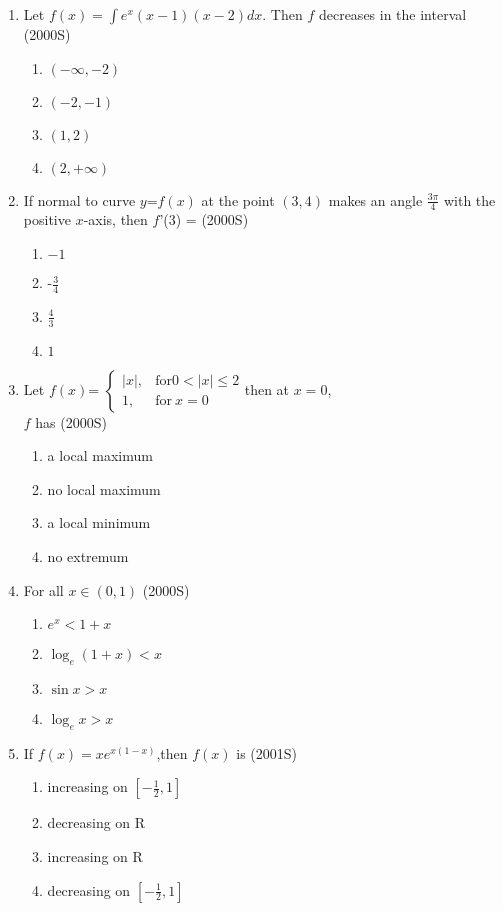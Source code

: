 \documentclass[journal,12pt,twocolumn]{IEEEtran}
\theoremstyle{remark}
\begin{document}
\begin{enumerate}[start=9]
\item Let $f(x)=\int e^x(x-1)(x-2)dx$. Then $f$ decreases in the interval 
\hfill {(2000S)}
\begin{enumerate}
    \item $(-\infty,-2)$
    \item $(-2,-1)$
    \item $(1,2)$
    \item $(2,+\infty)$\\
\end{enumerate}
\item If normal to curve $y$=$f(x)$ at the point $(3,4)$ makes an angle $\displaystyle\frac{3\pi}{4}$ with the positive $x$-axis, then $f$'(3) = \hfill(2000S)
\begin{enumerate}
    \item $-1$
    \item -$\displaystyle\frac{3}{4}$\\
    \item $\displaystyle\frac{4}{3}$
    \item $1$
\end{enumerate}
\item Let $f(x)$=
$\begin{cases}
|x|, & \text{for}  0<|x| \leq 2\\ 
1, & \text{for}\  x=0
\end{cases}$then at $x=0$, \\$f$ has
\hfill {(2000S)}
\begin{enumerate}
    \item a local maximum
    \item no local maximum
    \item a local minimum
    \item no extremum\\
\end{enumerate}
\item For all $x\in(0,1)$
\hfill {(2000S)}
\begin{enumerate}
    \item $e^x <1+x$
    \item $\log_e (1+x) < x$
    \item $ \sin x > x$
    \item $ \log_e x > x $\\
\end{enumerate}
\item If $f(x)=xe^{x(1-x)}$,then $f(x)$ is 
\hfill {(2001S)}
\begin{enumerate}
    \item increasing on $\left[-\displaystyle\frac{1}{2},1\right]$\\
    \item decreasing on R
    \item increasing on R
    \item decreasing on $\left[-\displaystyle\frac{1}{2},1\right]$\\\\
\end{enumerate}


\end{enumerate}
\end{document}
